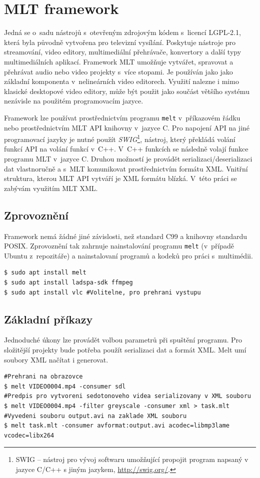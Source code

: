 \section{MLT framework}
Jedná se o~sadu nástrojů s~otevřeným zdrojovým kódem s~licencí LGPL-2.1, která byla původně vytvořena pro televizní vysílání. Poskytuje nástroje pro streamování, video editory, multimediální přehrávače, konvertory a další typy multimediálních aplikací. Framework MLT umožňuje vytvářet, spravovat a přehrávat audio nebo video projekty s~více stopami. Je používán jako jako základní komponenta v~nelineárních video editorech. Využití nalezne i mimo klasické desktopové video editory, může být použit jako součást většího systému nezávisle na použitém programovacím jazyce.

Framework lze používat prostřednictvím programu \texttt{melt} v~příkazovém řádku nebo prostřednictvím MLT API knihovny v~jazyce C. Pro napojení API na jiné programovací jazyky je nutné použít \textit{SWIG}\footnote{SWIG -- nástroj pro vývoj softwaru umožňující propojit program napsaný v jazyce C/C++ s jiným jazykem, \url{http://swig.org/}.}, nástroj, který překládá volání funkcí API na volání funkcí v~C++. V~C++ funkcích se následně volají funkce programu MLT v~jazyce C. Druhou možností je provádět serializaci/deserializaci dat vlastnoručně a s~MLT komunikovat prostřednictvím formátu XML. Vnitřní struktura, kterou MLT API vytváří je XML formátu blízká. V~této práci se zabývám využitím MLT XML.

\subsection{Zprovoznění}
Framework nemá žádné jiné závislosti, než standard C99 a knihovny standardu POSIX. Zprovoznění tak zahrnuje nainstalování programu \texttt{melt} (v~případě Ubuntu z~repozitáře) a nainstalovaní programů a kodeků pro práci s~multimédii.
\begin{lstlisting}[style=bash]
$ sudo apt install melt
$ sudo apt install ladspa-sdk ffmpeg
$ sudo apt install vlc #Volitelne, pro prehrani vystupu
\end{lstlisting}

\subsection{Základní příkazy}
Jednoduché úkony lze provádět volbou parametrů při spuštění programu. Pro složitější projekty bude potřeba použít serializaci dat a formát XML. Melt umí soubory XML načítat i generovat.
\begin{lstlisting}[style=bash]
#Prehrani na obrazovce
$ melt VIDEO0004.mp4 -consumer sdl
#Predpis pro vytvoreni sedotonoveho videa serializovany v XML souboru
$ melt VIDEO0004.mp4 -filter greyscale -consumer xml > task.mlt 
#Vyvedeni souboru output.avi na zaklade XML souboru
$ melt task.mlt -consumer avformat:output.avi acodec=libmp3lame vcodec=libx264
\end{lstlisting}
